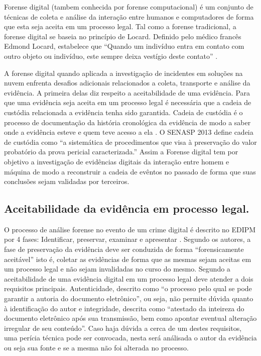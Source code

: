Forense digital (tambem conhecida por forense computacional) é um conjunto de técnicas de coleta e análise da interação entre humanos e computadores de forma que esta seja aceita em um processo legal.
%
Tal como a forense tradicional, a forense digital se baseia no princípio de Locard. Definido pelo médico francês Edmond Locard, estabelece que ``Quando um indivíduo entra em contato com outro objeto ou indivíduo, este sempre deixa vestígio deste contato'' \cite{Ramos:2011}.

A forense digital quando aplicada a investigação de incidentes em soluções na nuvem enfrenta desafios adicionais relacionados a coleta, transporte e análise da evidência.
%
A primeira delas diz respeito a aceitabilidade de uma evidência. Para que uma evidência seja aceita em um processo legal é necessária que a cadeia de custódia relacionada a evidência tenha sido garantida.
%
Cadeia de custódia é o processo de documentação da história cronológica da evidência de modo a saber onde a evidência esteve e quem teve acesso a ela \cite{Ramos:2011}. O SENASP 2013 define cadeia de custódia como ``a sistemática de procedimentos que visa à preservação do valor probatório da prova pericial caracterizada.''
%
Assim a Forense digital tem por objetivo a investigação de evidências digitais da interação entre homem e máquina de modo a reconstruir a cadeia de evêntos no passado de forma que suas conclusões sejam validadas por terceiros.


\subsection{Aceitabilidade da evidência em processo legal.}
\label{sec:credibilidadeaceitabilidadeevidencia}

O processo de análise forense no evento de um crime digital é descrito no EDIPM por 4 fases: Identificar, preservar, examinar e apresentar \cite{GrisposChallengesCloudComputing:2012}.
%
Segundo os autores, a fase de preservação da evidência deve ser conduzida de forma ``forensicamente aceitável'' isto é, coletar as evidências de forma que as mesmas sejam aceitas em um processo legal e não sejam invalidadas no curso do mesmo.
%
Segundo \cite{Ramos:2011} a aceitabilidade de uma evidência digital em um processo legal deve atender a dois requisitos principais. 
%
Autenticidade, descrito como ``o processo pelo qual se pode garantir a autoria do documento eletrônico'', ou seja, não permite dúvida quanto à identificação do autor e integridade, descrita como ``atestado da inteireza do documento eletrônico após sua transmissão, bem como apontar eventual alteração irregular de seu conteúdo''.
%
Caso haja dúvida a cerca de um destes requisitos, uma perícia técnica pode ser convocada, nesta será análisada o autor da evidência ou seja sua fonte e se a mesma não foi alterada no processo.


